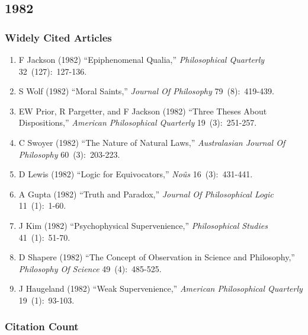\documentclass[
  10pt,
  letterpaper,
  DIV=11,
  numbers=noendperiod,
  twoside]{scrartcl}
\providecommand{\tightlist}{%
  \setlength{\itemsep}{0pt}\setlength{\parskip}{0pt}}\usepackage{longtable,booktabs,array}
\begin{document}
\newpage

\subsection{1982}\label{sec-s1982}

\subsubsection*{Widely Cited Articles}\label{widely-cited-articles-26}

\begin{enumerate}
\def\labelenumi{\arabic{enumi}.}
\tightlist
\item
  F Jackson (1982) ``Epiphenomenal Qualia,'' \emph{Philosophical
  Quarterly} 32~(127):~127-136.
\item
  S Wolf (1982) ``Moral Saints,'' \emph{Journal Of Philosophy}
  79~(8):~419-439.
\item
  EW Prior, R Pargetter, and F Jackson (1982) ``Three Theses About
  Dispositions,'' \emph{American Philosophical Quarterly}
  19~(3):~251-257.
\item
  C Swoyer (1982) ``The Nature of Natural Laws,'' \emph{Australasian
  Journal Of Philosophy} 60~(3):~203-223.
\item
  D Lewis (1982) ``Logic for Equivocators,'' \emph{Noûs}
  16~(3):~431-441.
\item
  A Gupta (1982) ``Truth and Paradox,'' \emph{Journal Of Philosophical
  Logic} 11~(1):~1-60.
\item
  J Kim (1982) ``Psychophysical Supervenience,'' \emph{Philosophical
  Studies} 41~(1):~51-70.
\item
  D Shapere (1982) ``The Concept of Observation in Science and
  Philosophy,'' \emph{Philosophy Of Science} 49~(4):~485-525.
\item
  J Haugeland (1982) ``Weak Supervenience,'' \emph{American
  Philosophical Quarterly} 19~(1):~93-103.
\end{enumerate}

\subsubsection*{Citation Count}\label{sec-count-1982}
\end{document}
